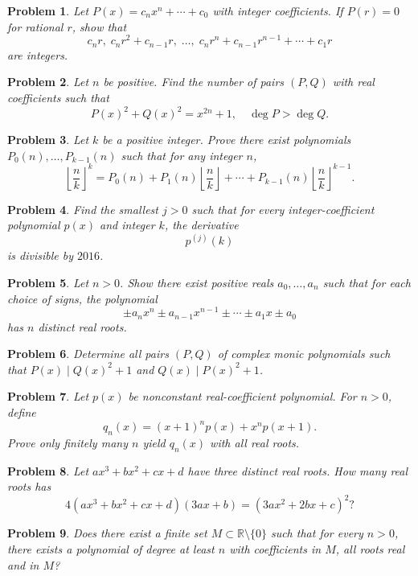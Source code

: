 \documentclass[12pt]{article}
\newtheorem{problem}{Problem}
\begin{document}
\begin{problem}
Let $P(x)=c_nx^n+\cdots+c_0$ with integer coefficients. If $P(r)=0$ for rational $r$, show that
\[
c_nr,\; c_nr^2+c_{n-1}r,\; \dots,\; c_nr^n+c_{n-1}r^{n-1}+\cdots+c_1r
\]
are integers.
\end{problem}

\begin{problem}
Let $n$ be positive. Find the number of pairs $(P,Q)$ with real coefficients such that
\[
P(x)^2+Q(x)^2=x^{2n}+1,\quad \deg P > \deg Q.
\]
\end{problem}

\begin{problem}
Let $k$ be a positive integer. Prove there exist polynomials $P_0(n),\dots,P_{k-1}(n)$ such that for any integer $n$,
\[
\left\lfloor\frac{n}{k}\right\rfloor^k = P_0(n)+P_1(n)\left\lfloor\frac{n}{k}\right\rfloor+\cdots+P_{k-1}(n)\left\lfloor\frac{n}{k}\right\rfloor^{k-1}.
\]
\end{problem}

\begin{problem}
Find the smallest $j>0$ such that for every integer-coefficient polynomial $p(x)$ and integer $k$, the derivative
\[
p^{(j)}(k)
\]
is divisible by $2016$.
\end{problem}

\begin{problem}
Let $n>0$. Show there exist positive reals $a_0,\dots,a_n$ such that for each choice of signs, the polynomial
\[
\pm a_nx^n \pm a_{n-1}x^{n-1} \pm \cdots \pm a_1x \pm a_0
\]
has $n$ distinct real roots.
\end{problem}

\begin{problem}
Determine all pairs $(P,Q)$ of complex monic polynomials such that $P(x)\mid Q(x)^2+1$ and $Q(x)\mid P(x)^2+1$.
\end{problem}

\begin{problem}
Let $p(x)$ be nonconstant real-coefficient polynomial. For $n>0$, define
\[
q_n(x)=(x+1)^np(x)+x^np(x+1).
\]
Prove only finitely many $n$ yield $q_n(x)$ with all real roots.
\end{problem}

\begin{problem}
Let $ax^3+bx^2+cx+d$ have three distinct real roots. How many real roots has
\[
4(ax^3+bx^2+cx+d)(3ax+b)=(3ax^2+2bx+c)^2?
\]
\end{problem}

\begin{problem}
Does there exist a finite set $M\subset\mathbb{R}\setminus\{0\}$ such that for every $n>0$, there exists a polynomial of degree at least $n$ with coefficients in $M$, all roots real and in $M$?
\end{problem}
\end{document}
